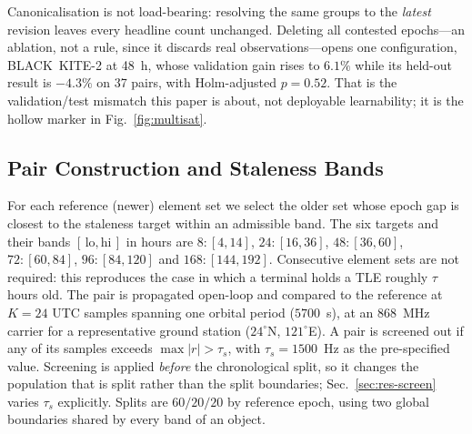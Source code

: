 \documentclass[conference]{IEEEtran}
\begin{document}
Canonicalisation is not load-bearing: resolving the same groups to the
\emph{latest} revision leaves every headline count unchanged. Deleting all
contested epochs---an ablation, not a rule, since it discards real
observations---opens one configuration, BLACK~KITE-2 at 48~h, whose validation
gain rises to $6.1\%$ while its held-out result is $-4.3\%$ on 37 pairs, with
Holm-adjusted $p=0.52$. That is the validation/test mismatch this paper is
about, not deployable learnability; it is the hollow marker in
Fig.~\ref{fig:multisat}.

\subsection{Pair Construction and Staleness Bands}
\label{sec:pairs}
For each reference (newer) element set we select the older set whose epoch gap
is closest to the staleness target within an admissible band. The six targets
and their bands $[\,\text{lo},\text{hi}\,]$ in hours are
$8\!:\![4,14]$, $24\!:\![16,36]$, $48\!:\![36,60]$, $72\!:\![60,84]$,
$96\!:\![84,120]$ and $168\!:\![144,192]$. Consecutive element sets are not
required: this reproduces the case in which a terminal holds a TLE roughly
$\tau$ hours old. The pair is propagated open-loop and compared to the reference
at $K=24$ UTC samples spanning one orbital period ($5700$~s), at an $868$~MHz
carrier for a representative ground station ($24^\circ$N, $121^\circ$E). A pair is screened out if any of its samples
exceeds $\max|r|>\tau_s$, with $\tau_s=1500$~Hz as the pre-specified value.
Screening is applied \emph{before} the chronological split, so it changes the
population that is split rather than the split boundaries;
Sec.~\ref{sec:res-screen} varies $\tau_s$ explicitly. Splits are $60/20/20$ by
reference epoch, using two global boundaries shared by every band of an object.
\end{document}
